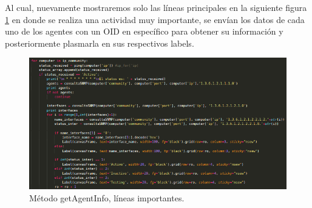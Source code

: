 Al cual, nuevamente mostraremos solo las líneas principales en la siguiente figura \ref{image:principal3} en donde se realiza una actividad muy importante, se envían los datos de cada uno de los agentes con un OID en específico para obtener su información y posteriormente plasmarla en sus respectivos labels.
\FloatBarrier
\begin{figure}[htbp!]
		\centering
	\includegraphics[width=.95 \textwidth]{images/principal3}
		\caption{Método getAgentInfo, líneas importantes.}		\label{image:principal3}
\end{figure}
\FloatBarrier

